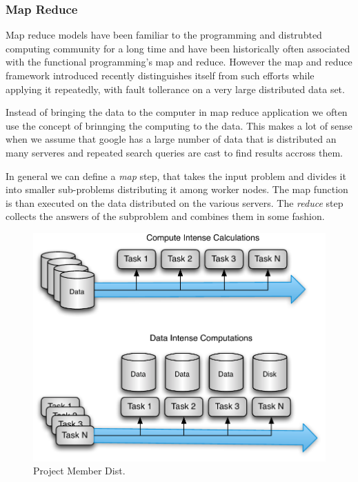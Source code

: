 
\subsubsection{Map Reduce}

Map reduce models have been familiar to the programming and distrubted
computing community for a long time and have been historically often
associated with the functional programming's map and reduce. However
the map and reduce framework introduced recently \cite{Dean:mapreduce}
distinguishes itself from such efforts while
applying it repeatedly, with fault tollerance on a very large
distributed data set. 

Instead of bringing the data to the computer in map reduce application
we often use the concept of brinnging the computing to the data. This
makes a lot of sense when we assume that google has a large number of
data that is distributed an many serveres and repeated search queries
are cast to find results accross them. 

In general we can define a {\em map} step, that takes the input problem and divides it
into smaller sub-problems distributing it among worker nodes. The map
function is than executed on the data distributed on the various
servers. The {\em reduce} step collects the answers of the subproblem and combines
them in some fashion. 

\begin{figure}[htb]
  \centering
    \includegraphics[width=1.0\textwidth]{images/mapreduce.pdf}
  \caption{Project Member Dist.}
\end{figure}

